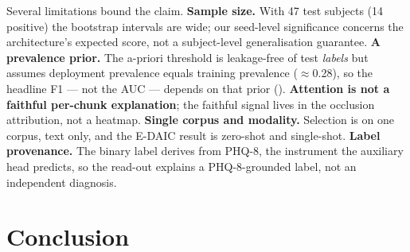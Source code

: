 \documentclass[conference]{IEEEtran}
\begin{document}
Several limitations bound the claim. \textbf{Sample size.} With 47 test subjects
(14 positive) the bootstrap intervals are wide; our seed-level significance
concerns the architecture's expected score, not a subject-level generalisation
guarantee. \textbf{A prevalence prior.} The a-priori threshold is leakage-free of
test \emph{labels} but assumes deployment prevalence equals training prevalence
($\approx$0.28), so the headline F1 --- not the AUC --- depends on that prior
(). \textbf{Attention is not a faithful per-chunk explanation};
the faithful signal lives in the occlusion attribution, not a heatmap.
\textbf{Single corpus and modality.} Selection is on one corpus, text only, and
the E-DAIC result is zero-shot and single-shot. \textbf{Label provenance.} The
binary label derives from PHQ-8, the instrument the auxiliary head predicts, so
the read-out explains a PHQ-8-grounded label, not an independent diagnosis.

\section{Conclusion}
\end{document}
